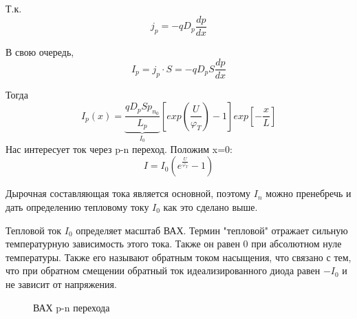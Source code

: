 Т.к.
$$
j_p = -qD_p\frac{dp}{dx}
$$

В свою очередь, 
$$
I_p = j_p \cdot S = -qD_pS\frac{dp}{dx} 
$$

Тогда 
$$
I_p(x) = \underbrace{\frac{qD_pSp_{n_0}}{L_p}}_{I_0}\left[exp\left(\frac{U}{\varphi_T}\right) -1 \right] exp\left[-\frac{x}{L}\right]
$$
Нас интересует ток через p-n переход. Положим x=0:
\begin{equation}
I = I_0\left(e^{\frac{U}{\varphi_T}} -1 \right)
\end{equation}

Дырочная составляющая тока является основной, поэтому $I_n$ можно пренебречь и дать определению тепловому току $I_0$ как это сделано выше.

Тепловой ток $I_0$ определяет масштаб ВАХ. Термин "тепловой" отражает сильную температурную зависимость этого тока. Также он равен 0 при абсолютном нуле температуры. Также его называют обратным током насыщения, что связано с тем, что при обратном смещении обратный ток идеализированного диода равен $-I_0$ и не зависит от напряжения.

\begin{center}
	\begin{figure}[h!]
		\caption{ВАХ p-n перехода}
	\end{figure}
\end{center}
\pagebreak


